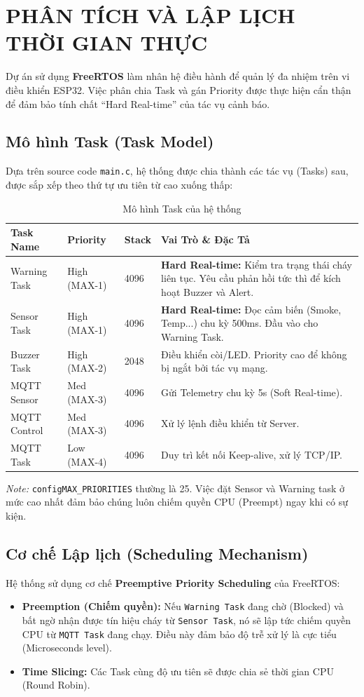 \documentclass[12pt,a4paper]{report}
\begin{document}
\chapter{PHÂN TÍCH VÀ LẬP LỊCH THỜI GIAN THỰC}

Dự án sử dụng \textbf{FreeRTOS} làm nhân hệ điều hành để quản lý đa nhiệm trên vi điều khiển ESP32. Việc phân chia Task và gán Priority được thực hiện cẩn thận để đảm bảo tính chất ``Hard Real-time'' của tác vụ cảnh báo.

\section{Mô hình Task (Task Model)}
Dựa trên source code \texttt{main.c}, hệ thống được chia thành các tác vụ (Tasks) sau, được sắp xếp theo thứ tự ưu tiên từ cao xuống thấp:

\begin{table}[H]
\centering
\begin{tabular}{|l|l|l|p{7cm}|}
\hline
\textbf{Task Name} & \textbf{Priority} & \textbf{Stack} & \textbf{Vai Trò \& Đặc Tả} \\ \hline
Warning Task & High (MAX-1) & 4096 & \textbf{Hard Real-time:} Kiểm tra trạng thái cháy liên tục. Yêu cầu phản hồi tức thì để kích hoạt Buzzer và Alert. \\ \hline
Sensor Task & High (MAX-1) & 4096 & \textbf{Hard Real-time:} Đọc cảm biến (Smoke, Temp...) chu kỳ 500ms. Đầu vào cho Warning Task. \\ \hline
Buzzer Task & High (MAX-2) & 2048 & Điều khiển còi/LED. Priority cao để không bị ngắt bởi tác vụ mạng. \\ \hline
MQTT Sensor & Med (MAX-3) & 4096 & Gửi Telemetry chu kỳ 5s (Soft Real-time). \\ \hline
MQTT Control & Med (MAX-3) & 4096 & Xử lý lệnh điều khiển từ Server. \\ \hline
MQTT Task & Low (MAX-4) & 4096 & Duy trì kết nối Keep-alive, xử lý TCP/IP. \\ \hline
\end{tabular}
\caption{Mô hình Task của hệ thống}
\end{table}

\textit{Note:} \texttt{configMAX\_PRIORITIES} thường là 25. Việc đặt Sensor và Warning task ở mức cao nhất đảm bảo chúng luôn chiếm quyền CPU (Preempt) ngay khi có sự kiện.

\section{Cơ chế Lập lịch (Scheduling Mechanism)}
Hệ thống sử dụng cơ chế \textbf{Preemptive Priority Scheduling} của FreeRTOS:
\begin{itemize}
    \item \textbf{Preemption (Chiếm quyền):} Nếu \texttt{Warning Task} đang chờ (Blocked) và bất ngờ nhận được tín hiệu cháy từ \texttt{Sensor Task}, nó sẽ lập tức chiếm quyền CPU từ \texttt{MQTT Task} đang chạy. Điều này đảm bảo độ trễ xử lý là cực tiểu (Microseconds level).
    \item \textbf{Time Slicing:} Các Task cùng độ ưu tiên sẽ được chia sẻ thời gian CPU (Round Robin).
\end{itemize}
\end{document}

